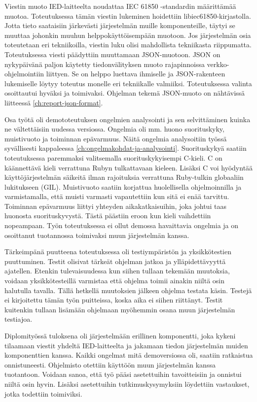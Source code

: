 Viestin muoto IED-laitteelta noudattaa IEC 61850 -standardin määrittämää muotoa. Toteutuksessa tämän viestin lukeminen hoidettiin libiec61850-kirjastolla. Jotta tieto saataisiin järkevästi järjestelmän muille komponenteille, täytyi se muuttaa johonkin muuhun helppokäyttöisempään muotoon. Jos järjestelmän osia toteutetaan eri tekniikoilla, viestin luku olisi mahdollista tekniikasta riippumatta. Toteutuksessa viesti päädyttiin muuttamaan JSON-muotoon. JSON on nykypäivänä paljon käytetty tiedonvälityksen muoto rajapinnoissa verkko-ohjelmointiin liittyen. Se on helppo luettava ihmiselle ja JSON-rakenteen lukemiselle löytyy toteutus monelle eri tekniikalle valmiiksi. Toteutuksessa valinta osoittautui hyväksi ja toimivaksi. Ohjelman tekemä JSON-muoto on nähtävissä liitteessä \ref{ch:report-json-format}.

Osa työtä oli demototeutuksen ongelmien analysointi ja sen selvittäminen kuinka ne vältettäisiin uudessa versiossa. Ongelmia oli mm. huono suorituskyky, muistivuoto ja toiminnan epävarmuus. Näitä ongelmia analysoitiin työssä syvällisesti kappaleessa \ref{ch:ongelmakohdat-ja-analysointi}. Suorituskykyä saatiin toteutuksessa paremmaksi valitsemalla suorituskykyisempi C-kieli. C on käännettävä kieli verrattuna Rubyn tulkattavaan kieleen. Lisäksi C voi hyödyntää käyttöjärjestelmän säikeitä ilman rajoituksia verrattuna Ruby-tulkin globaaliin lukitukseen (GIL). Muistivuoto saatiin korjattua huolellisella ohjelmoinnilla ja varmistamalla, että muisti varmasti vapautettiin kun sitä ei enää tarvittu. Toiminnan epävarmuus liittyi yhteyden aikakatkaisuihin, joka johtui taas huonosta suorituskyvystä. Tästä päästiin eroon kun kieli vaihdettiin nopeampaan. Työn toteutuksessa ei ollut demossa havaittavia ongelmia ja on osoittanut tuotannossa toimivaksi muun järjestelmän kanssa.

Tärkeimpänä puutteena toteutuksessa oli testiympäristön ja yksikkötestien puuttuminen. Testit olisivat tärkeät ohjelman jatkoa ja ylläpidettävyyttä ajatellen. Etenkin tulevaisuudessa kun siihen tullaan tekemään muutoksia, voidaan yksikkötesteillä varmistaa että ohjelma toimii ainakin niiltä osin halutulla tavalla. Tällä hetkellä muutoksien jälkeen ohjelma testata käsin. Testejä ei kirjoitettu tämän työn puitteissa, koska aika ei siihen riittänyt. Testit kuitenkin tullaan lisämään ohjelmaan myöhemmin osana muun järjestelmän testiajoa.

Diplomityössä tuloksena oli järjestelmään erillinen komponentti, joka kykeni tilaamaan viestit yhdeltä IED-laitteelta ja jakamaan tiedon järjestelmän muiden komponenttien kanssa. Kaikki ongelmat mitä demoversiossa oli, saatiin ratkaistua onnistuneesti. Ohjelmisto otettiin käyttöön muun järjestelmän kanssa tuotantoon. Voidaan sanoa, että työ pääsi asetettuihin tavoitteisiin ja onnistui niiltä osin hyvin. Lisäksi asetettuihin tutkimuskysymyksiin löydettiin vastaukset, jotka todettiin toimiviksi.